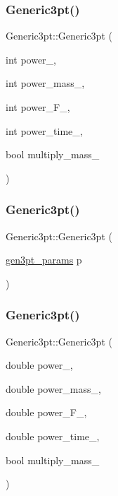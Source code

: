 \subsubsection{\texorpdfstring{Generic3pt()}{Generic3pt()}\hspace{0.1cm}{\footnotesize\ttfamily [1/4]}}
{\footnotesize\ttfamily Generic3pt\+::\+Generic3pt (\begin{DoxyParamCaption}\item[{int}]{power\+\_\+,  }\item[{int}]{power\+\_\+mass\+\_\+,  }\item[{int}]{power\+\_\+\+F\+\_\+,  }\item[{int}]{power\+\_\+time\+\_\+,  }\item[{bool}]{multiply\+\_\+mass\+\_\+ }\end{DoxyParamCaption})\hspace{0.3cm}{\ttfamily [inline]}}

\mbox{\label{classGeneric3pt_ae80fda20a523118353e7ccf5199a54a8}} 
\subsubsection{\texorpdfstring{Generic3pt()}{Generic3pt()}\hspace{0.1cm}{\footnotesize\ttfamily [2/4]}}
{\footnotesize\ttfamily Generic3pt\+::\+Generic3pt (\begin{DoxyParamCaption}\item[{\mbox{\hyperlink{structgen3pt__params}{gen3pt\+\_\+params}}}]{p }\end{DoxyParamCaption})\hspace{0.3cm}{\ttfamily [inline]}}

\mbox{\label{classGeneric3pt_a2c67116c08e611709658f4063e553fa1}} 
\subsubsection{\texorpdfstring{Generic3pt()}{Generic3pt()}\hspace{0.1cm}{\footnotesize\ttfamily [3/4]}}
{\footnotesize\ttfamily Generic3pt\+::\+Generic3pt (\begin{DoxyParamCaption}\item[{double}]{power\+\_\+,  }\item[{double}]{power\+\_\+mass\+\_\+,  }\item[{double}]{power\+\_\+\+F\+\_\+,  }\item[{double}]{power\+\_\+time\+\_\+,  }\item[{bool}]{multiply\+\_\+mass\+\_\+ }\end{DoxyParamCaption})\hspace{0.3cm}{\ttfamily [inline]}}

